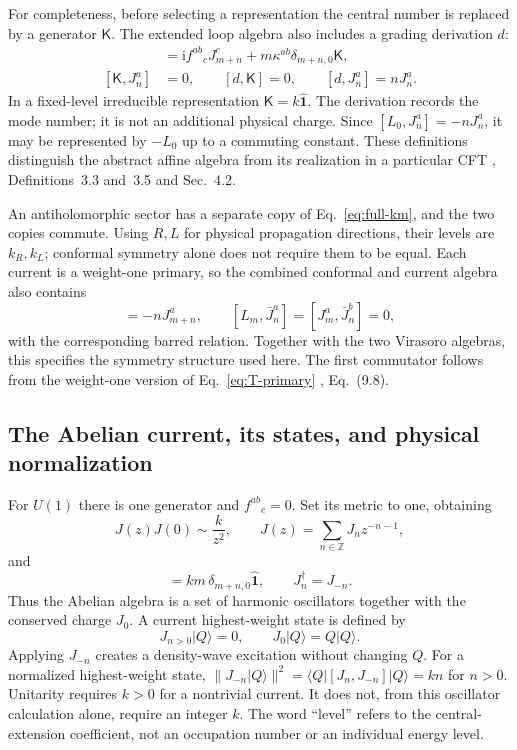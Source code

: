 \documentclass[aps,prb,onecolumn,nofootinbib,superscriptaddress]{revtex4-2}
\newcommand{\One}{\hat{\mathbf{1}}}
\newcommand{\ii}{\mathrm{i}}
\newcommand{\ket}[1]{\lvert #1\rangle}
\newcommand{\bra}[1]{\langle #1\rvert}
\begin{document}
For completeness, before selecting a representation the central number
is replaced by a generator $\mathsf K$. The extended loop algebra also
includes a grading derivation $d$:
\begin{align}
 [J_m^a,J_n^b]&=\ii f^{ab}{}_cJ^c_{m+n}
          +m\kappa^{ab}\delta_{m+n,0}\mathsf K,\nonumber\\
 [\mathsf K,J_n^a]&=0,\qquad [d,\mathsf K]=0,
       \qquad [d,J_n^a]=nJ_n^a.
 \label{eq:affine-extension}
\end{align}
In a fixed-level irreducible representation $\mathsf K=k\One$.
The derivation records the mode number; it is not an additional physical
charge. Since $[L_0,J_n^a]=-nJ_n^a$, it may be represented by $-L_0$
up to a commuting constant. These definitions distinguish the abstract
affine algebra from its realization in a particular CFT
\cite{HernandezAffine}, Definitions~3.3 and~3.5 and Sec.~4.2.

An antiholomorphic sector has a separate copy of
Eq.~\eqref{eq:full-km}, and the two copies commute. Using $R,L$ for
physical propagation directions, their levels are $k_R,k_L$; conformal
symmetry alone does not require them to be equal. Each current is a
weight-one primary, so the combined conformal and current algebra also
contains
\begin{equation}
 [L_m,J_n^a]=-nJ_{m+n}^a,
 \qquad [L_m,\bar J_n^a]=[J_m^a,\bar J_n^b]=0,
 \label{eq:virasoro-current}
\end{equation}
with the corresponding barred relation. Together with the two Virasoro
algebras, this specifies the symmetry structure used here. The first
commutator follows from the weight-one version of
Eq.~\eqref{eq:T-primary} \cite{Ginsparg1989}, Eq.~(9.8).

\subsection{The Abelian current, its states, and physical normalization}
For $U(1)$ there is one generator and $f^{ab}{}_c=0$. Set its metric to
one, obtaining
\begin{equation}
 J(z)J(0)\sim\frac{k}{z^2},\qquad
 J(z)=\sum_{n\in\mathbb Z}J_nz^{-n-1},
 \label{eq:current-ope}
\end{equation}
and
\begin{equation}
 [J_m,J_n]=km\,\delta_{m+n,0}\One,
 \qquad J_n^\dagger=J_{-n}.
 \label{eq:km}
\end{equation}
Thus the Abelian algebra is a set of harmonic oscillators together with
the conserved charge $J_0$. A current highest-weight state is defined by
\begin{equation}
 J_{n>0}\ket Q=0,\qquad J_0\ket Q=Q\ket Q.
 \label{eq:current-highest-weight}
\end{equation}
Applying $J_{-n}$ creates a density-wave excitation without changing
$Q$. For a normalized highest-weight state,
$\|J_{-n}\ket Q\|^2=\bra Q[J_n,J_{-n}]\ket Q=kn$ for $n>0$.
Unitarity requires $k>0$ for a nontrivial current. It does not, from this
oscillator calculation alone, require an integer $k$. The word
``level'' refers to the central-extension coefficient, not an occupation
number or an individual energy level.
\end{document}
